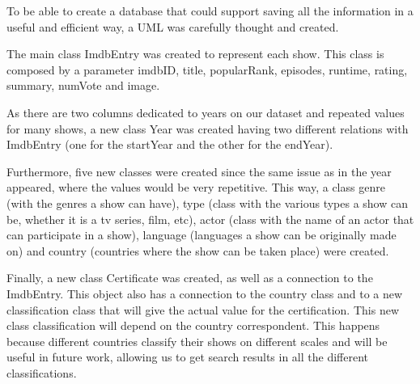 \documentclass[sigplan,screen]{acmart}
\begin{document}
To be able to create a database that could support saving all the information in a useful and efficient way, a UML was carefully thought and created.

The main class ImdbEntry was created to represent each show. This class is composed by a parameter imdbID, title, popularRank, episodes, runtime, rating, summary, numVote and image.

As there are two columns dedicated to years on our dataset and repeated values for many shows, a new class Year was created having two different relations with ImdbEntry (one for the startYear and the other for the endYear).

Furthermore, five new classes were created since the same issue as in the year appeared, where the values would be very repetitive. This way, a class genre (with the genres a show can have), type (class with the various types a show can be, whether it is a tv series, film, etc), actor (class with the name of an actor that can participate in a show), language (languages a show can be originally made on) and country (countries where the show can be taken place) were created.

Finally, a new class Certificate was created, as well as a connection to the ImdbEntry. This object also has a connection to the country class and to a new classification class that will give the actual value for the certification. This new class classification will depend on the country correspondent. This happens because different countries classify their shows on different scales and will be useful in future work, allowing us to get search results in all the different classifications.
\end{document}
